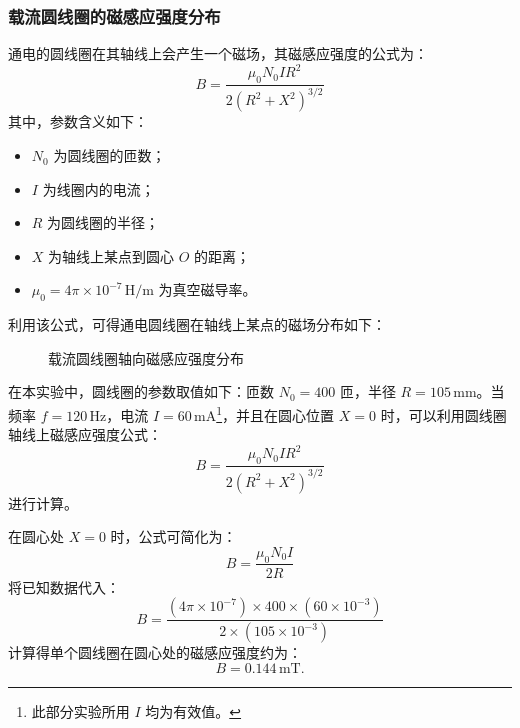\documentclass[UTF-8,twoside,cs4size]{ctexart}
\begin{document}
\subsubsection{载流圆线圈的磁感应强度分布}
通电的圆线圈在其轴线上会产生一个磁场，其磁感应强度的公式为：
\[
B = \frac{\mu_0 N_0 I R^2}{2 (R^2 + X^2)^{3/2}}
\]
其中，参数含义如下：
\begin{itemize}
    \item $N_0$ 为圆线圈的匝数；
    \item $I$ 为线圈内的电流；
    \item $R$ 为圆线圈的半径；
    \item $X$ 为轴线上某点到圆心 $O$ 的距离；
    \item $\mu_0 = 4\pi \times 10^{-7} \, \mathrm{H/m}$ 为真空磁导率。
\end{itemize}
利用该公式，可得通电圆线圈在轴线上某点的磁场分布如下：
\begin{figure}[!h]
    \centering
    \caption{载流圆线圈轴向磁感应强度分布}
\end{figure}

在本实验中，圆线圈的参数取值如下：匝数 $N_0 = 400$ 匝，半径 $R = 105 \, \mathrm{mm}$。当频率 $f = 120 \, \mathrm{Hz}$，电流 $I = 60 \, \mathrm{mA}$\footnote{此部分实验所用 $I$ 均为有效值。}，并且在圆心位置 $X = 0$ 时，可以利用圆线圈轴线上磁感应强度公式：
\[
B = \frac{\mu_0 N_0 I R^2}{2 (R^2 + X^2)^{3/2}}
\]
进行计算。 \par
在圆心处 $X = 0$ 时，公式可简化为：
\[
B = \frac{\mu_0 N_0 I}{2 R}
\]
将已知数据代入：
\[
B = \frac{(4\pi \times 10^{-7}) \times 400 \times (60 \times 10^{-3})}{2 \times (105 \times 10^{-3})}
\]
计算得单个圆线圈在圆心处的磁感应强度约为：
\[
B = 0.144 \, \mathrm{mT}.
\]
\end{document}
